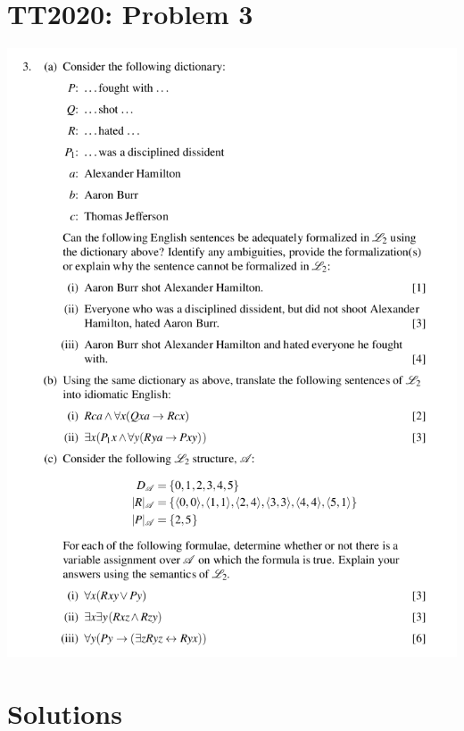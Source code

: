 \documentclass[a4paper, 11pt]{article} %
\theoremstyle{theorem}
\theoremstyle{Pthm}
\begin{document}







\vspace{-50pt}


\section*{TT2020: Problem 3}

\begin{center}
  \includegraphics[width=1\textwidth]{Problem3.png}
\end{center}



\section*{Solutions}
\end{document}
